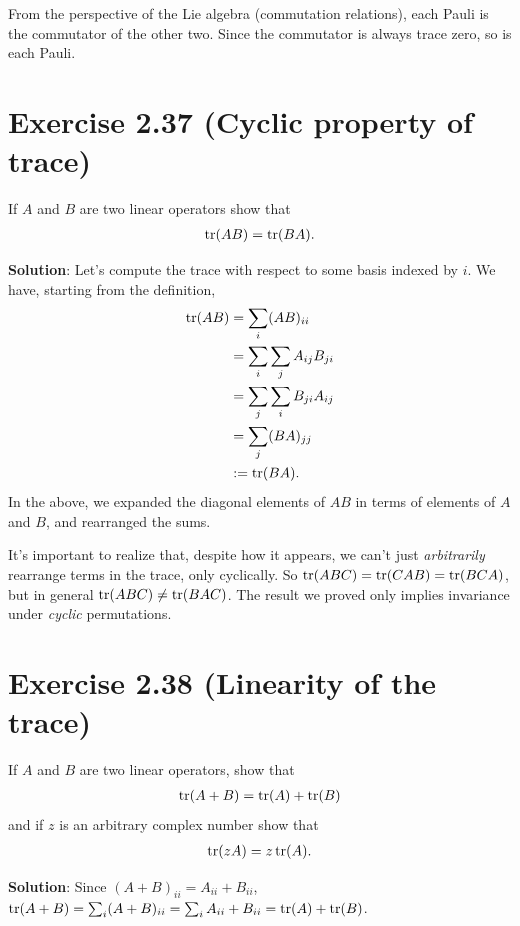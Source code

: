 \documentclass{book}
\begin{document}
    From the perspective of the Lie algebra (commutation relations), each Pauli is the commutator of the other two. Since the commutator is always trace zero, so is each Pauli. 

\section*{Exercise 2.37 (Cyclic property of trace)}
    If $A$ and $B$ are two linear operators show that
    \begin{align}
        \tr(AB) = \tr(BA). 
    \end{align}
    
    \textbf{Solution}: Let's compute the trace with respect to some basis indexed by $i$. We have, starting from the definition,
    \begin{align}
    \begin{aligned}
        \tr(AB) &= \sum_{i} (AB)_{ii} \\
        &= \sum_{i}\sum_{j} A_{ij} B_{ji} \\
        &= \sum_{j} \sum_{i}B_{ji} A_{ij} \\
        &= \sum_{j} (BA)_{jj} \\
        &:= \tr(BA).
    \end{aligned}
    \end{align}
    In the above, we expanded the diagonal elements of $AB$ in terms of elements of $A$ and $B$, and rearranged the sums. 
    
    It's important to realize that, despite how it appears, we can't just \emph{arbitrarily} rearrange terms in the trace, only cyclically. So $\tr(ABC) = \tr(CAB) = \tr(BCA)$, but in general $\tr(ABC) \neq \tr(BAC)$. The result we proved only implies invariance under \emph{cyclic} permutations.

\section*{Exercise 2.38 (Linearity of the trace)}
    If $A$ and $B$ are two linear operators, show that
    \begin{align}
        \tr(A+B) = \tr(A) + \tr(B)
    \end{align}
    and if $z$ is an arbitrary complex number show that 
    \begin{align}
        \tr(z A) = z \tr(A).
    \end{align}
    
    \textbf{Solution}: Since $(A+B)_{ii} = A_{ii} + B_{ii}$, $\tr(A+B) = \sum_i (A+B)_{ii} = \sum_i A_{ii} + B_{ii} = \tr(A) + \tr(B)$. 
    
\end{document}
